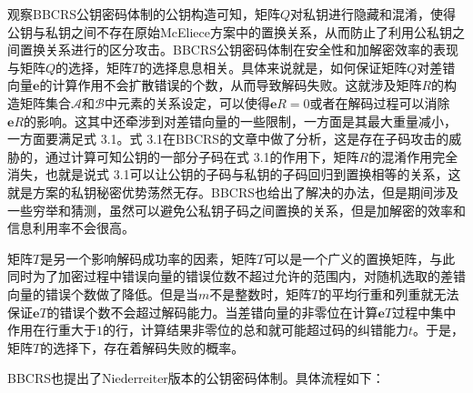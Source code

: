 观察BBCRS公钥密码体制的公钥构造可知，矩阵$Q$对私钥进行隐藏和混淆，使得公钥与私钥之间不存在原始McEliece方案中的置换关系，从而防止了利用公私钥之间置换关系进行的区分攻击。BBCRS公钥密码体制在安全性和加解密效率的表现与矩阵$Q$的选择，矩阵$T$的选择息息相关。具体来说就是，如何保证矩阵$Q$对差错向量$\mathbf{e}$的计算作用不会扩散错误的个数，从而导致解码失败。这就涉及矩阵$R$的构造矩阵集合$\mathcal{A}$和$\mathcal{B}$中元素的关系设定，可以使得$\mathbf{e}R = 0$或者在解码过程可以消除$\mathbf{e}R$的影响。这其中还牵涉到对差错向量的一些限制，一方面是其最大重量减小，一方面要满足式 3.1。式 3.1在BBCRS的文章中做了分析，这是存在子码攻击的威胁的，通过计算可知公钥的一部分子码在式 3.1的作用下，矩阵$R$的混淆作用完全消失，也就是说式 3.1可以让公钥的子码与私钥的子码回归到置换相等的关系，这就是方案的私钥秘密优势荡然无存。BBCRS也给出了解决的办法，但是期间涉及一些穷举和猜测，虽然可以避免公私钥子码之间置换的关系，但是加解密的效率和信息利用率不会很高。

矩阵$T$是另一个影响解码成功率的因素，矩阵$T$可以是一个广义的置换矩阵，与此同时为了加密过程中错误向量的错误位数不超过允许的范围内，对随机选取的差错向量的错误个数做了降低。但是当$m$不是整数时，矩阵$T$的平均行重和列重就无法保证$\mathbf{e}T$的错误个数不会超过解码能力。当差错向量的非零位在计算$\mathbf{e}T$过程中集中作用在行重大于$1$的行，计算结果非零位的总和就可能超过码的纠错能力$t$。于是，矩阵$T$的选择下，存在着解码失败的概率。

BBCRS也提出了Niederreiter版本的公钥密码体制。具体流程如下：

